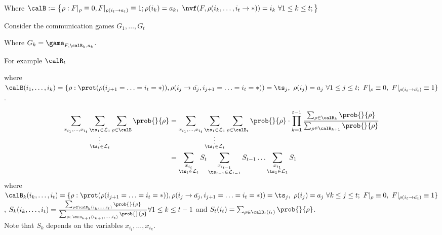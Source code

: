 Where $\calB:= 
    \left\{ \rho:
        F|_\rho \equiv 0, F|_{\rho(i_t \to a_t)} \equiv 1;  
        \rho(i_k) = a_k,\
        \nvf(F,\rho(i_k, \ldots ,i_t \to *)) = i_k\ \forall 1 \leq k \leq t;        
    \right\}
$

Consider the communication games $G_1, \dots , G_t$ 

Where $G_k = \game_{F,\calR_k,a_k}$. 

For example 
$\calR_t$




where $\calB(i_1,\ldots ,i_k) = \Bk{1}$.

\begin{align*}
        \sum_{x_{i_1}, \ldots , x_{i_t}}   \sum_{\substack{\ts_1 \in \mathcal{L}_1\\ \vdots \\ \ts_t \in \mathcal{L}_t}}\sum_{\rho \in \calB} \prob{}{\rho}
        &= \sum_{x_{i_1}, \ldots , x_{i_t}}\sum_{\substack{\ts_1 \in \mathcal{L}_1\\ \vdots \\ \ts_t \in \mathcal{L}_t}}\sum_{\rho \in \calB_t} \prob{}{\rho} \cdot \prod_{k =1}^{t-1} \frac{\sum_{\rho \in \calB_k} \prob{}{\rho}}{\sum_{\rho \in \calB_{k+1}} \prob{}{\rho}}\\
        &= \sum_{\substack{x_{i_t}\\ \ts_t \in \mathcal{L}_t}} S_t \sum_{\substack{x_{i_{t-1}}\\ \ts_{t-1} \in \mathcal{L}_{t-1}}} S_{t-1} \ldots \sum_{\substack{x_{i_1}\\ \ts_1 \in \mathcal{L}_1}} S_1
\end{align*}
where $\calB_k(i_k, \ldots , i_t) = \Bk{k}$, 
$S_k(i_k, \ldots , i_t) = \frac{\sum_{\rho \in \calB_k(i_k, \ldots , i_t)} \prob{}{\rho}}{\sum_{\rho \in \calB_{k+1}(i_{k+1}, \ldots ,i_t)}\prob{}{\rho}} \forall 1 \leq k \leq t-1$ and $S_t(i_t) = \sum_{\rho \in \calB_t(i_t)} \prob{}{\rho}$.\\
Note that $S_k$ depends on the variables $x_{i_t}, \ldots, x_{i_k}$. 

